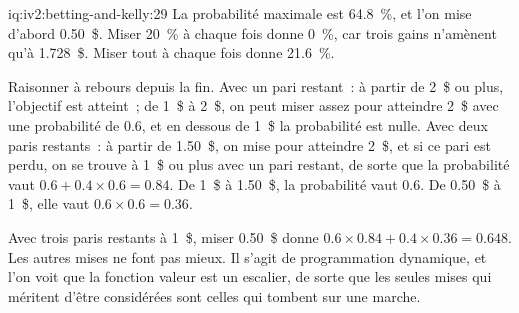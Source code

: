 \begin{solution}{iq:iv2:betting-and-kelly:29}
La probabilité maximale est 64.8~\%, et l'on mise d'abord 0.50~\$. Miser 20~\% à chaque fois donne 0~\%, car trois gains n'amènent qu'à 1.728~\$. Miser tout à chaque fois donne 21.6~\%.

Raisonner à rebours depuis la fin. Avec un pari restant~: à partir de 2~\$ ou plus, l'objectif est atteint~; de 1~\$ à 2~\$, on peut miser assez pour atteindre 2~\$ avec une probabilité de 0.6, et en dessous de 1~\$ la probabilité est nulle. Avec deux paris restants~: à partir de 1.50~\$, on mise pour atteindre 2~\$, et si ce pari est perdu, on se trouve à 1~\$ ou plus avec un pari restant, de sorte que la probabilité vaut $0.6 + 0.4 \times 0.6 = 0.84$. De 1~\$ à 1.50~\$, la probabilité vaut 0.6. De 0.50~\$ à 1~\$, elle vaut $0.6 \times 0.6 = 0.36$.

Avec trois paris restants à 1~\$, miser 0.50~\$ donne $0.6 \times 0.84 + 0.4 \times 0.36 = 0.648$. Les autres mises ne font pas mieux. Il s'agit de programmation dynamique, et l'on voit que la fonction valeur est un escalier, de sorte que les seules mises qui méritent d'être considérées sont celles qui tombent sur une marche.

\end{solution}

